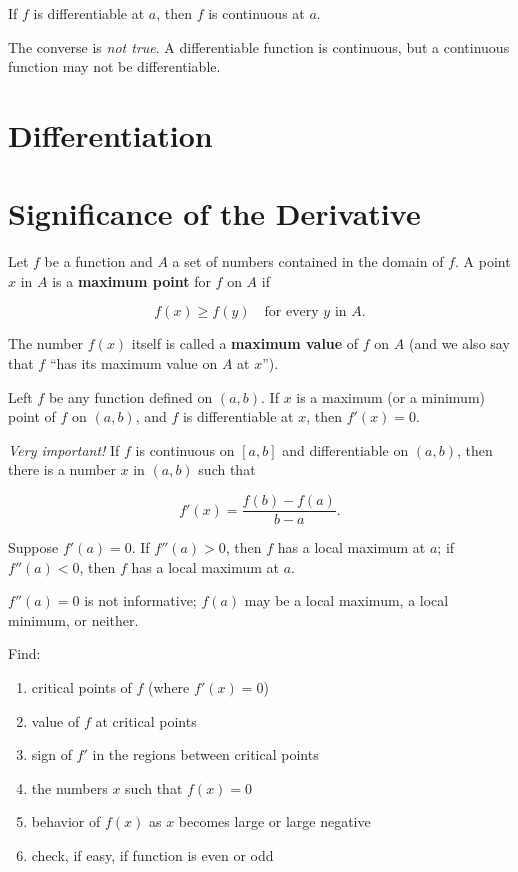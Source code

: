 \documentclass[11pt]{article}
\newcommand{\setnumref}[2]{\setcounter{#1}{#2}\addtocounter{#1}{-1}}
\newcommand{\sectionref}[1]{\setnumref{section}{#1}\section}
\newenvironment{theoremref}[1]
{\renewcommand\theinnerthmref{#1}\innerthmref}
{\endinnerthmref}
\begin{document}
\begin{theoremref}{9-1}
  If $f$ is differentiable at $a$, then $f$ is continuous at $a$.
  \begin{remark}
    The converse is \emph{not true}. A differentiable function is
    continuous, but a continuous function may not be differentiable.
  \end{remark}
\end{theoremref}

\sectionref{10}{Differentiation}

\sectionref{11}{Significance of the Derivative}

\begin{definition}
  Let $f$ be a function and $A$ a set of numbers contained in the
  domain of $f$. A point $x$ in $A$ is a \textbf{maximum point} for
  $f$ on $A$ if

  \[
  f(x) \geq f(y) \quad \text{for every $y$ in $A$.}
  \]

  The number $f(x)$ itself is called a \textbf{maximum value} of $f$
  on $A$ (and we also say that $f$ ``has its maximum value on $A$ at
  $x$'').
\end{definition}

\begin{theoremref}{11-1}
  Left $f$ be any function defined on $(a,b)$. If $x$ is a maximum
  (or a minimum) point of $f$ on $(a,b)$, and $f$ is differentiable
  at $x$, then $f'(x) = 0$.
\end{theoremref}

\begin{theoremref}{11-4}[Mean Value Theorem]
  \emph{Very important!} If $f$ is continuous on $[a,b]$ and
  differentiable on $(a,b)$, then there is a number $x$ in $(a,b)$
  such that

  \[
  f'(x) = \frac{f(b) - f(a)}{b - a}.
  \]
\end{theoremref}

\begin{theoremref}{11-5}
  Suppose $f'(a) = 0$. If $f''(a) > 0$, then $f$ has a local maximum
  at $a$; if $f''(a) < 0$, then $f$ has a local maximum at $a$.
  \begin{remark}
    $f''(a) = 0$ is not informative; $f(a)$ may be a local maximum, a
    local minimum, or neither.
  \end{remark}
\end{theoremref}

\begin{remark}
  Find:
  \begin{enumerate}
  \item critical points of $f$ (where $f'(x) = 0$)
  \item value of $f$ at critical points
  \item sign of $f'$ in the regions between critical points
  \item the numbers $x$ such that $f(x) = 0$
  \item behavior of $f(x)$ as $x$ becomes large or large negative
  \item check, if easy, if function is even or odd
  \end{enumerate}
\end{remark}
\end{document}
